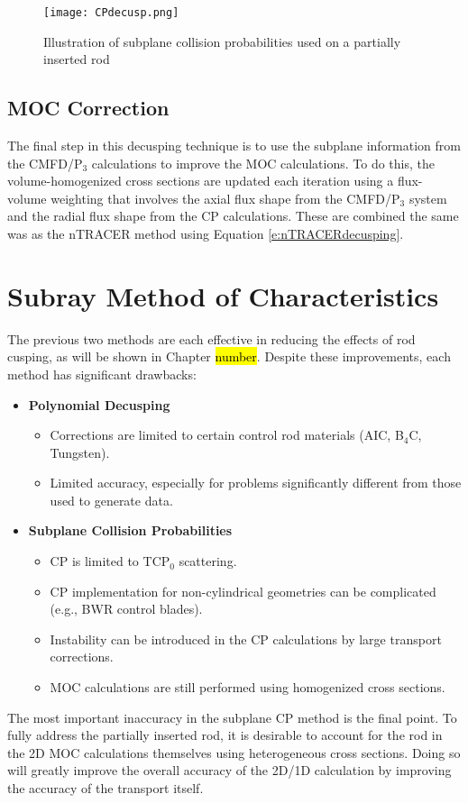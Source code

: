 \begin{figure}
    \centering
    \texttt{[image: CPdecusp.png]}
    \caption{Illustration of subplane collision probabilities used on a partially inserted rod}\label{f:SCPdecusping}
\end{figure}

\subsection{MOC Correction}

The final step in this decusping technique is to use the subplane information from the CMFD/P$_3$ calculations to improve the MOC calculations.  To do this, the volume-homogenized cross sections are updated each iteration using a flux-volume weighting that involves the axial flux shape from the CMFD/P$_3$ system and the radial flux shape from the CP calculations.  These are combined the same was as the nTRACER method using Equation \ref{e:nTRACERdecusping}.

\section{Subray Method of Characteristics}

The previous two methods are each effective in reducing the effects of rod cusping, as will be shown in Chapter \hl{number}.  Despite these improvements, each method has significant drawbacks:
\begin{itemize}[leftmargin=*]
    \item \textbf{Polynomial Decusping}
    
    \begin{itemize}
        \item Corrections are limited to certain control rod materials (AIC, B$_4$C, Tungsten).
        \item Limited accuracy, especially for problems significantly different from those used to generate data.
    \end{itemize}

    \item \textbf{Subplane Collision Probabilities}
    
    \begin{itemize}
        \item CP is limited to TCP$_0$ scattering.
        \item CP implementation for non-cylindrical geometries can be complicated (e.g., BWR control blades).
        \item Instability can be introduced in the CP calculations by large transport corrections.
        \item MOC calculations are still performed using homogenized cross sections.
    \end{itemize}
\end{itemize}
The most important inaccuracy in the subplane CP method is the final point.  To fully address the partially inserted rod, it is desirable to account for the rod in the 2D MOC calculations themselves using heterogeneous cross sections.  Doing so will greatly improve the overall accuracy of the 2D/1D calculation by improving the accuracy of the transport itself.

